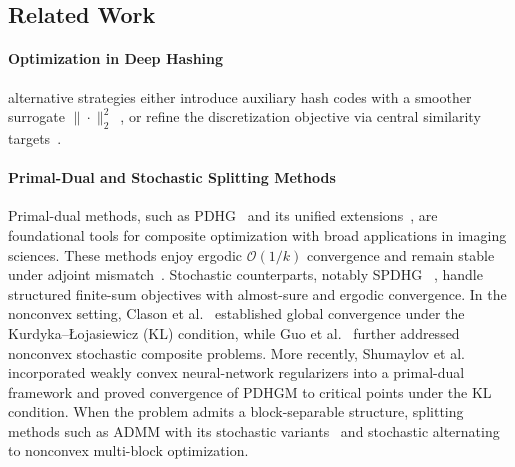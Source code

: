 \subsection{Related Work}
\label{Section: related work}
\paragraph{Optimization in Deep Hashing} 
alternative strategies either introduce auxiliary hash codes with a 
smoother surrogate $\|\cdot\|_2^2$~\cite{liDeepSupervisedHashing,
li2017deep,liFeatureLearningBased2016}, or refine the discretization 
objective via central similarity targets~\cite{yuanCentralSimilarityQuantization2020}.

\paragraph{Primal-Dual and Stochastic Splitting Methods} Primal-dual methods, such as PDHG~\cite{chambolleFirstOrderPrimalDualAlgorithm2011} and its unified extensions~\cite{esserZhangChan2010}, are foundational tools for composite optimization with broad applications in imaging sciences. These methods enjoy ergodic $\mathcal{O}(1/k)$ convergence and remain stable under adjoint mismatch~\cite{chouzenouxAdjointMismatch}. Stochastic counterparts, notably SPDHG~\cite{chambolleSPDHG2018} , handle structured finite-sum objectives with almost-sure and ergodic convergence. In the nonconvex setting, Clason et al.~\cite{clasonAccelerationGlobalConvergence2019} established global convergence under the Kurdyka--{\L}ojasiewicz (KL) condition, while Guo et al.~\cite{guo2023preconditioned} further addressed nonconvex stochastic composite problems. More recently, Shumaylov et al.~\cite{shumaylovweakly} incorporated weakly convex neural-network regularizers into a primal-dual framework and proved convergence of PDHGM to critical points under the KL condition. When the problem admits a block-separable structure, splitting methods such as ADMM with its stochastic variants~ and stochastic alternating   to nonconvex multi-block optimization.

